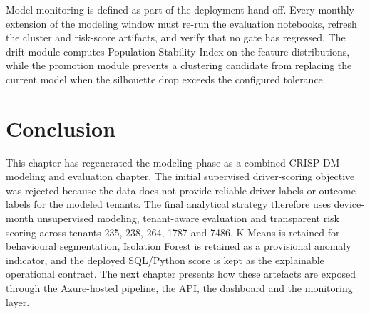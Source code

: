 Model monitoring is defined as part of the deployment hand-off. Every monthly extension of the modeling window must re-run the evaluation notebooks, refresh the cluster and risk-score artifacts, and verify that no gate has regressed. The drift module computes Population Stability Index on the feature distributions, while the promotion module prevents a clustering candidate from replacing the current model when the silhouette drop exceeds the configured tolerance.

\section{Conclusion}
This chapter has regenerated the modeling phase as a combined CRISP-DM modeling and evaluation chapter. The initial supervised driver-scoring objective was rejected because the data does not provide reliable driver labels or outcome labels for the modeled tenants. The final analytical strategy therefore uses device-month unsupervised modeling, tenant-aware evaluation and transparent risk scoring across tenants 235, 238, 264, 1787 and 7486. K-Means is retained for behavioural segmentation, Isolation Forest is retained as a provisional anomaly indicator, and the deployed SQL/Python score is kept as the explainable operational contract. The next chapter presents how these artefacts are exposed through the Azure-hosted pipeline, the API, the dashboard and the monitoring layer.
